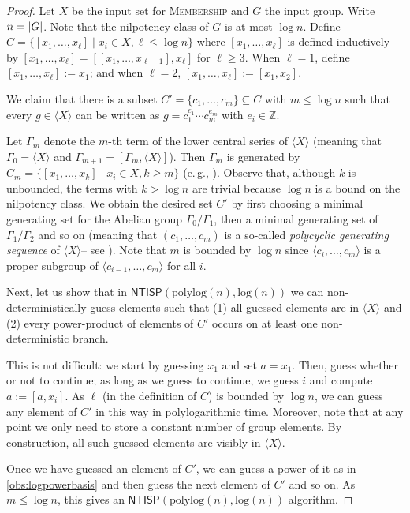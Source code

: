 \documentclass{article}
\newcommand{\algprobm}[1]{\textsc{#1}\xspace}
\newcommand{\Z}{\mathbb{Z}}
\newcommand{\abs}[1]{\left|\mathinner{#1}\right|}
\newcommand*{\ComplexityClass}[1]{\ensuremath{\mathsf{#1}}\xspace}
\newcommand{\NTISP}{\ComplexityClass{NTISP}}
\newcommand{\NTISPpll}{\ensuremath{\NTISP(\mathrm{polylog}(n),\mathrm{log}(n))}\xspace}
\begin{document}
\begin{proof}
 Let $X$ be the input set for \algprobm{Membership} and $G$ the input group. Write $n = \abs{G}$. Note that the nilpotency class of $G$ is at most $\log n$. Define $C = \{[x_1, \dots, x_\ell]\mid x_i \in X, \ell \leq \log n\}$ where $[x_1, \dots, x_\ell]$ is defined inductively by $[x_1, \dots, x_\ell] = [[x_1, \dots, x_{\ell-1}],x_\ell]$ for $\ell \geq 3$. When $\ell = 1$, define $[x_{1}, \ldots, x_{\ell}] := x_{1}$; and when $\ell = 2$, $[x_{1}, \ldots, x_{\ell}] := [x_{1}, x_{2}]$.


We claim that there is a subset $C'= \{c_1, \dots, c_m\} \subseteq C$ with $m \leq \log n$ such that every $g \in \langle X \rangle$ can be written as $g = c_1^{e_1} \cdots c_m^{e_m}$ with $e_i \in \Z$.




Let $\Gamma_m$ denote the $m$-th term of the lower central series of $\langle X \rangle$ (meaning that $\Gamma_0 = \langle X \rangle$ and $\Gamma_{m+1} = [\Gamma_m, \langle X \rangle]$). 
Then $\Gamma_m$ is generated by $C_m = \{[x_1, \dots, x_k]\mid x_i \in X, k\geq m\}$ (e.\,g., \cite[Lemma 2.6]{ClementMZ17}). 
Observe that, although $k$ is unbounded, the terms with $k >\log n$ are trivial because $\log n$ is a bound on the nilpotency class.
We obtain the desired set $C'$ by first choosing a minimal generating set for the Abelian group $\Gamma_0/\Gamma_1$, then a minimal generating set of $\Gamma_1/\Gamma_2$ and so on (meaning that $(c_1, \dots, c_m)$ is a so-called \emph{polycyclic generating sequence} of $\langle X \rangle$-- see \cite[Chapter~8]{Holt2005HandbookOC}). Note that $m$ is bounded by $\log n$ since $\langle c_i, \dots, c_m\rangle$ is a proper subgroup of $\langle c_{i-1}, \dots, c_m\rangle$ for all $i$.

Next, let us show that in \NTISPpll we can non-deterministically guess elements such that (1) all guessed elements are in $\langle X \rangle$ and (2) every power-product of elements of $C'$ occurs on at least one non-deterministic branch. 

This is not difficult: we start by guessing $x_1$ and set $a=x_1$. Then, guess whether or not to continue; as long as we guess to continue, we guess $i$ and compute $a := [a,x_i]$. As $\ell$ (in the definition of $C$) is bounded by $\log n$, we can guess any element of $C'$ in this way in polylogarithmic time. Moreover, note that at any point we only need to store a constant number of group elements. By construction, all such guessed elements are visibly in $\langle X \rangle$.

Once we have guessed an element of $C'$, we can guess a power of it as in  \cref{obs:logpowerbasis} and then guess the next element of $C'$ and so on.
As $m\leq \log n$, this gives an \NTISPpll\xspace algorithm.
\end{proof}
\end{document}
